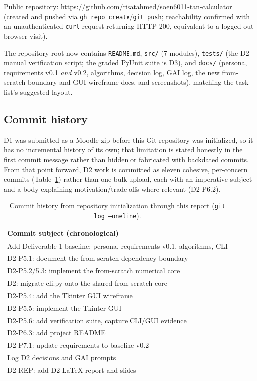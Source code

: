 \documentclass[11pt]{article}
\begin{document}
Public repository: \url{https://github.com/risatahmed/soen6011-tan-calculator} (created and pushed via \texttt{gh repo create}/\texttt{git push}; reachability confirmed with an unauthenticated \texttt{curl} request returning HTTP 200, equivalent to a logged-out browser visit).

The repository root now contains \texttt{README.md}, \texttt{src/} (7 modules), \texttt{tests/} (the D2 manual verification script; the graded PyUnit suite is D3), and \texttt{docs/} (persona, requirements v0.1 \emph{and} v0.2, algorithms, decision log, GAI log, the new from-scratch boundary and GUI wireframe docs, and screenshots), matching the task list's suggested layout.

\subsection{Commit history}

D1 was submitted as a Moodle zip before this Git repository was initialized, so it has no incremental history of its own; that limitation is stated honestly in the first commit message rather than hidden or fabricated with backdated commits. From that point forward, D2 work is committed as eleven cohesive, per-concern commits (Table~\ref{tab:commits}) rather than one bulk upload, each with an imperative subject and a body explaining motivation/trade-offs where relevant (D2-P6.2).

\begin{table}[htbp]
\centering
\footnotesize
\begin{tabular}{p{9.5cm}}
\toprule
\textbf{Commit subject (chronological)} \\
\midrule
Add Deliverable 1 baseline: persona, requirements v0.1, algorithms, CLI \\
D2-P5.1: document the from-scratch dependency boundary \\
D2-P5.2/5.3: implement the from-scratch numerical core \\
D2: migrate cli.py onto the shared from-scratch core \\
D2-P5.4: add the Tkinter GUI wireframe \\
D2-P5.5: implement the Tkinter GUI \\
D2-P5.6: add verification suite, capture CLI/GUI evidence \\
D2-P6.3: add project README \\
D2-P7.1: update requirements to baseline v0.2 \\
Log D2 decisions and GAI prompts \\
D2-REP: add D2 LaTeX report and slides \\
\bottomrule
\end{tabular}
\caption{Commit history from repository initialization through this report (\texttt{git log --oneline}).}
\label{tab:commits}
\end{table}
\end{document}
